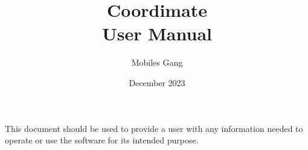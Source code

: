 \documentclass{article}
\title{Coordimate\\User Manual}
\date{December 2023}
\author{Mobiles Gang}
\begin{document}
\maketitle

This document should be used to provide a user with any information needed to
operate or use the software for its intended purpose.
\end{document}
